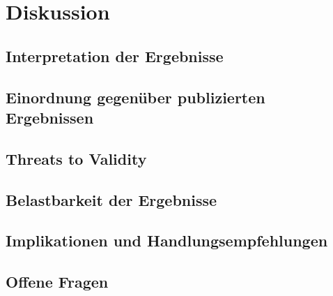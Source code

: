 \chapter{Diskussion}\label{ch:Diskussion}

\section{Interpretation der Ergebnisse}\label{ch:Diskussion:Interpretation der Ergebnisse}

\section{Einordnung gegenüber publizierten Ergebnissen}\label{ch:Diskussion:Einordnung gegenüber publizierten Ergebnissen}

\section{Threats to Validity}\label{ch:Diskussion:Threats to Validity}

\section{Belastbarkeit der Ergebnisse}\label{ch:Diskussion:Belastbarkeit der Ergebnisse}

\section{Implikationen und Handlungsempfehlungen}\label{ch:Diskussion:Implikationen und Handlungsempfehlungen}

\section{Offene Fragen}\label{ch:Diskussion:Offene Fragen}

